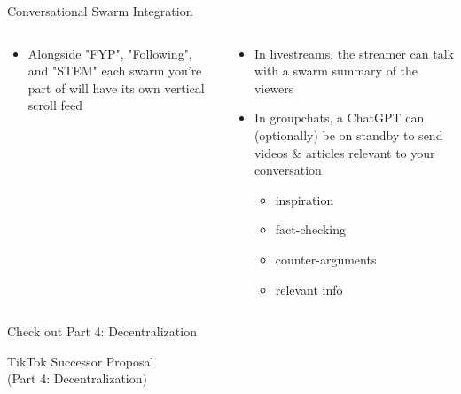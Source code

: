 \documentclass[aspectratio=169]{beamer}
\begin{document}
\begin{frame}{Conversational Swarm Integration}
\begin{columns}[T]
    \begin{column}[T]{0.5\textwidth}
        \begin{itemize}
            \item Alongside "FYP", "Following", and "STEM" each swarm you're part of will have its own vertical scroll feed
        \end{itemize}
    \end{column}
    \begin{column}{0.5\textwidth}
        \begin{itemize}
            \item In livestreams, the streamer can talk with a swarm summary of the viewers
            \item In groupchats, a ChatGPT can (optionally) be on standby to send videos \& articles relevant to your conversation
            \begin{itemize}
                \item inspiration
                \item fact-checking
                \item counter-arguments
                \item relevant info
            \end{itemize}
        \end{itemize}
    \end{column}
\end{columns}
\end{frame}

\begin{frame}{Check out Part 4: Decentralization}
\end{frame}

\begin{frame}
    \centering
    \Huge TikTok Successor Proposal \\
    \Huge (Part 4: Decentralization)
\end{frame}
\end{document}
